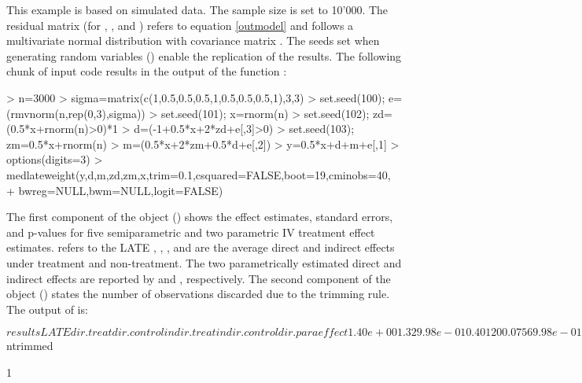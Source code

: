 \documentclass[nojss]{jss}
\begin{document}
This example is based on simulated data. The sample size  is set to 10'000. The residual matrix  (for , , and ) refers to equation \eqref{outmodel} and follows a multivariate normal distribution with covariance matrix . The seeds set when generating random variables () enable the replication of the results. The following chunk of  input code results in the output of the function :

\begin{Schunk}
\begin{Sinput}
> n=3000
> sigma=matrix(c(1,0.5,0.5,0.5,1,0.5,0.5,0.5,1),3,3)
> set.seed(100); e=(rmvnorm(n,rep(0,3),sigma))
> set.seed(101); x=rnorm(n)
> set.seed(102); zd=(0.5*x+rnorm(n)>0)*1
> d=(-1+0.5*x+2*zd+e[,3]>0)
> set.seed(103); zm=0.5*x+rnorm(n)
> m=(0.5*x+2*zm+0.5*d+e[,2])
> y=0.5*x+d+m+e[,1]
> options(digits=3)
> medlateweight(y,d,m,zd,zm,x,trim=0.1,csquared=FALSE,boot=19,cminobs=40,
+               bwreg=NULL,bwm=NULL,logit=FALSE)
\end{Sinput}
\end{Schunk}

The first component of the  object () shows the effect estimates, standard errors, and p-values for five semiparametric and two parametric IV treatment effect estimates.  refers to the LATE , , , and  are the average direct and indirect effects under treatment and non-treatment. The two parametrically estimated direct and indirect effects are reported by  and , respectively. The second component of the  object () states the number of observations discarded due to the trimming rule. The output of  is:

\begin{Schunk}
\begin{Soutput}
$results
            LATE dir.treat dir.control indir.treat indir.control  dir.para
effect  1.40e+00      1.32    9.98e-01     0.40120        0.0756  9.98e-01
se      1.61e-01      1.36    1.27e-01     0.13582        1.3589  4.46e-02
p-value 2.95e-18      0.33    4.50e-15     0.00314        0.9556 8.09e-111
        indir.para
effect    0.444446
se        0.133849
p-value   0.000899

$ntrimmed

1
\end{Soutput}
\end{Schunk}
\end{document}
